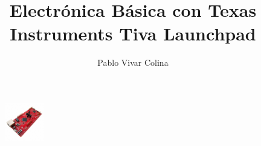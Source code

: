 \documentclass[]{article}
\title{Electrónica Básica con Texas Instruments Tiva Launchpad}
\author{Pablo Vivar Colina}
\begin{document}
\maketitle


\begin{figure}[h!]
	\centering
	\includegraphics[width=0.15\textwidth]{MFG_EK-TM4C1294XL}
\end{figure}

\end{document}
